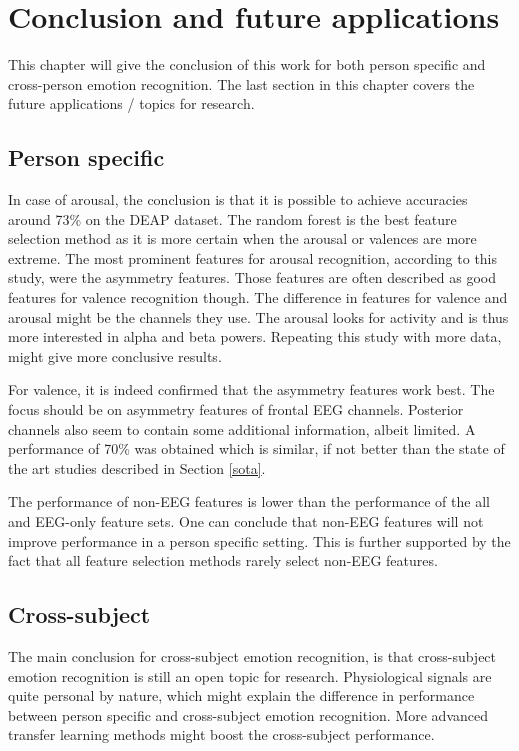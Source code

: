 \chapter{Conclusion and future applications}
{\samenvatting This chapter will give the conclusion of this work for both person specific and cross-person emotion recognition. The last section in this chapter covers the future applications / topics for research.}

\section{Person specific}
In case of arousal, the conclusion is that it is possible to achieve accuracies around 73\% on the DEAP dataset. The random forest is the best feature selection method as it is more certain when the arousal or valences are more extreme. The most prominent features for arousal recognition, according to this study, were the asymmetry features. Those features are often described as good features for valence recognition though. The difference in features for valence and arousal might be the channels they use. The arousal looks for activity and is thus more interested in alpha and beta powers. Repeating this study with more data, might give more conclusive results.

\npar

For valence, it is indeed confirmed that the asymmetry features work best. The focus should be on asymmetry features of frontal EEG channels. Posterior channels also seem to contain some additional information, albeit limited. A performance of 70\% was obtained which is similar, if not better than the state of the art studies described in Section \ref{sota}. 

\npar

The performance of non-EEG features is lower than the performance of the all and EEG-only feature sets. One can conclude that non-EEG features will not improve performance in a person specific setting. This is further supported by the fact that all feature selection methods rarely select non-EEG features. 

\clearpage

\section{Cross-subject}

The main conclusion for cross-subject emotion recognition, is that cross-subject emotion recognition is still an open topic for research. Physiological signals are quite personal by nature, which might explain the difference in performance between person specific and cross-subject emotion recognition. More advanced transfer learning methods might boost the cross-subject performance.

